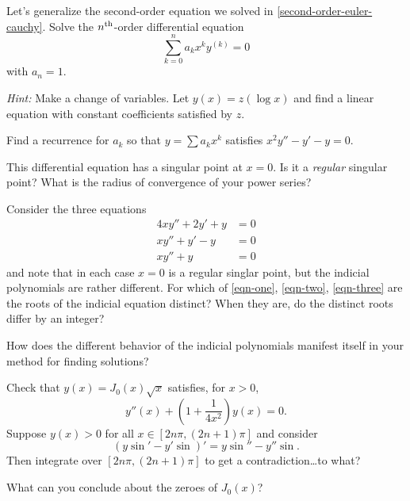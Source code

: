 \documentclass{homework}
\begin{document}
\begin{problem}
  Let's generalize the second-order equation we solved in
  \ref{second-order-euler-cauchy}.  Solve the
  $n^{\mbox{\scriptsize th}}$-order differential equation
  \[
    \sum_{k=0}^n a_k x^k y^{(k)} = 0
  \]
  with $a_n = 1$.

  \textit{Hint:} Make a change of variables.  Let $y(x) = z(\log x)$ and
  find a linear equation with constant coefficients satisfied by $z$.
\end{problem}

\begin{problem}
  Find a recurrence for $a_k$ so that $y = \sum a_k x^k$ satisfies \(x^2 y'' - y' - y = 0\).

  This differential equation has a singular point at $x = 0$.  Is it a
  \textit{regular} singular point?  What is the radius of convergence
  of your power series?
\end{problem}

\begin{problem}
  Consider the three equations
  \begin{align}
    4xy'' + 2y' + y &= 0 \label{eqn-one}\\
    x y'' + y' - y &= 0 \label{eqn-two}\\
    x y'' + y &= 0 \label{eqn-three}
  \end{align}
  and note that in each case $x=0$ is a regular singlar point, but the
  indicial polynomials are rather different.  For which of
  \eqref{eqn-one}, \eqref{eqn-two}, \eqref{eqn-three} are the roots of
  the indicial equation distinct?  When they are, do the distinct
  roots differ by an integer?

  How does the different behavior of the indicial polynomials manifest
  itself in your method for finding solutions?
\end{problem}


\begin{problem}\label{finding-zeroes-of-bessel}Check that $y(x) = J_0(x) \sqrt{x}$ satisfies, for $x > 0$,
  \[
    y''(x) + \left( 1 + \frac{1}{4x^2} \right) y(x) = 0.
  \]
  Suppose $y(x) > 0$ for all $x \in [2 n \pi, (2n+1) \pi]$ and consider
  \[
    \left( y \sin' - y' \sin \right)' = y \sin '' - y'' \sin. %
  \]
  Then integrate over $[2n \pi, (2n+1) \pi]$ to get a
  contradiction\ldots to what?

  What can you conclude about the zeroes of $J_0(x)$?
\end{problem}
\end{document}
